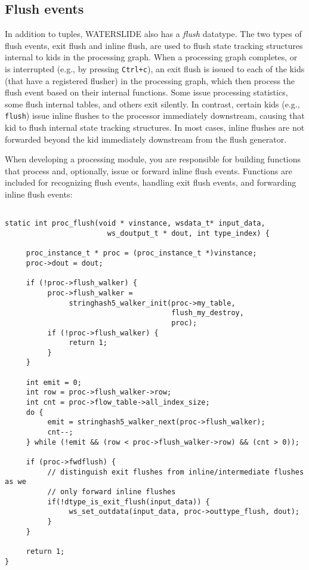 \documentclass[11pt]{article}
\begin{document}
\subsection{Flush events}
In addition to tuples, WATERSLIDE also has a \emph{flush} datatype. The two types of flush events,
exit flush and inline flush, are used to flush state tracking structures internal to kids in the
processing graph. When a processing graph completes, or is interrupted (e.g., by pressing
\texttt{Ctrl+c}), an exit flush is issued to each of the kids (that have a registered flusher) in
the processing graph, which then process the flush event based on their internal functions. Some
issue processing statistics, some flush internal tables, and others exit silently. In contrast,
certain kids (e.g., \texttt{flush}) issue inline flushes to the processor immediately downstream,
causing that kid to flush internal state tracking structures. In most cases, inline flushes are not
forwarded beyond the kid immediately downstream from the flush generator.

When developing a processing module, you are responsible for building functions that process and,
optionally, issue or forward inline flush events. Functions are included for recognizing flush events, handling
exit flush events, and forwarding inline flush events:
\begin{lstlisting}

static int proc_flush(void * vinstance, wsdata_t* input_data,
                        ws_doutput_t * dout, int type_index) {

     proc_instance_t * proc = (proc_instance_t *)vinstance;
     proc->dout = dout;

     if (!proc->flush_walker) {
          proc->flush_walker =
               stringhash5_walker_init(proc->my_table,
                                       flush_my_destroy,
                                       proc);     
          if (!proc->flush_walker) {
               return 1;
          }
     }

     int emit = 0;
     int row = proc->flush_walker->row;
     int cnt = proc->flow_table->all_index_size;
     do {
          emit = stringhash5_walker_next(proc->flush_walker);
          cnt--;
     } while (!emit && (row < proc->flush_walker->row) && (cnt > 0));

     if (proc->fwdflush) {
          // distinguish exit flushes from inline/intermediate flushes as we
          // only forward inline flushes
          if(!dtype_is_exit_flush(input_data)) {
               ws_set_outdata(input_data, proc->outtype_flush, dout);
          }
     }

     return 1;
}
\end{lstlisting}
\end{document}
